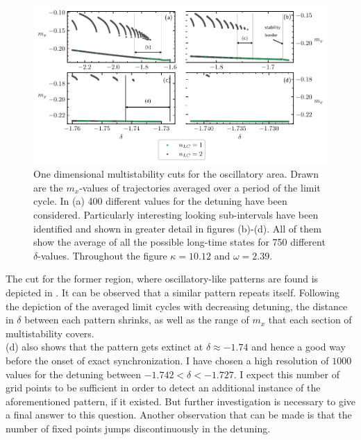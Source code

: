 \begin{figure}[H]
    \hspace*{-1.2cm}
    \includegraphics{pictures/multistab_line.pdf}
    \caption{One dimensional multistability cuts for the oscillatory area. Drawn are the $m_x$-values of trajectories averaged over a period of the limit cycle. In (a) 400 different values for the detuning have been considered. Particularly interesting looking sub-intervals have been identified and shown in greater detail in figures (b)-(d). All of them show the average of all the possible long-time states for 750 different $\delta$-values. Throughout the figure $\kappa=10.12$ and $\omega=2.39$.}
    \label{fig:osci_cut}
\end{figure}
The cut for the former region, where oscillatory-like patterns are found is depicted in . It can be observed that a similar pattern repeats itself. Following the depiction of the averaged limit cycles with decreasing detuning, the distance in $\delta$ between each pattern shrinks, as well as the range of $m_x$ that each section of multistability covers. \\(d) also shows that the pattern gets extinct at $\delta\approx-1.74$ and hence a good way before the onset of exact synchronization. I have chosen a high resolution of $1000$ values for the detuning between $-1.742<\delta<-1.727$. I expect this number of grid points to be sufficient in order to detect an additional instance of the aforementioned pattern, if it existed. But further investigation is necessary to give a final answer to this question. Another observation that can be made is that the number of fixed points jumps discontinuously in the detuning.\\\\
